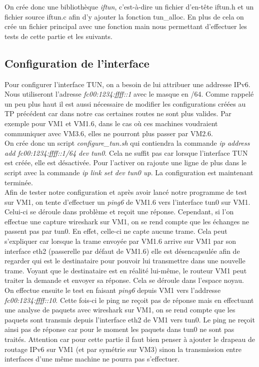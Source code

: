 \documentclass[a4paper, 12pt]{article}
\begin{document}
    On crée donc une bibliothèque \textit{iftun}, c'est-à-dire un fichier
    d'en-tête iftun.h et un fichier source iftun.c afin d'y ajouter la fonction
    tun\_alloc. En plus de cela on crée un fichier principal avec une fonction 
    main nous permettant d'effectuer les tests de cette partie et les suivants.

    \subsection{Configuration de l'interface}
    Pour configurer l'interface TUN, on a besoin de lui attribuer une addresse
    IPv6. Nous utiliseront l'adresse \textit{fc00:1234:ffff::1} avec le masque
    en /64. Comme rappelé un peu plus haut il est aussi nécessaire de modifier
    les configurations créées au TP précédent car dans notre cas certaines 
    routes ne sont plus valides. Par exemple pour VM1 et VM1.6, dans le cas où
    ces machines voudraient communiquer avec VM3.6, elles ne pourront plus 
    passer par VM2.6. \\

    On crée donc un script \textit{configure\_tun.sh} qui contiendra la commande
    \textit{ip address add fc00:1234:ffff::1/64 dev tun0}. Cela ne suffit pas 
    car lorsque l'interface TUN est créée, elle est désactivée. Pour l'activer 
    on rajoute une ligne de plus dans le script avec la commande \textit{ip 
    link set dev tun0 up}. La configuration est maintenant terminée. \\

    Afin de tester notre configuration et après avoir lancé notre programme de 
    test sur VM1, on tente d'effectuer un \textit{ping6} de VM1.6 vers 
    l'interface tun0 sur VM1. Celui-ci se déroule dans problème et reçoit une 
    réponse. Cependant, si l'on effectue une capture wireshark sur VM1, on se 
    rend compte que les échanges ne passent pas par tun0. En effet, celle-ci ne
    capte aucune trame. Cela peut s'expliquer car lorsque la trame envoyée par 
    VM1.6 arrive sur VM1 par son interface eth2 (passerelle par défaut de 
    VM1.6) elle est désencapsulée afin de regarder qui est le destinataire pour
    pouvoir lui transmettre dans une nouvelle trame. Voyant que le destinataire
    est en réalité lui-même, le routeur VM1 peut traiter la demande et envoyer 
    sa réponse. Cela se déroule dans l'espace noyau. \\

    On effectue ensuite le test en faisant \textit{ping6} depuis VM1 vers
    l'addresse \textit{fc00:1234:ffff::10}. Cette fois-ci le ping ne reçoit 
    pas de réponse mais en effectuant une analyse de paquets avec wireshark
    sur VM1, on se rend compte que les paquets sont transmis depuis 
    l'interface eth2 de VM1 vers tun0. Le ping ne reçoit ainsi pas de réponse 
    car pour le moment les paquets dans tun0 ne sont pas traités. Attention 
    car pour cette partie il faut bien penser à ajouter le drapeau de routage
    IPv6 sur VM1 (et par symétrie sur VM3) sinon la transmission entre 
    interfaces d'une même machine ne pourra pas s'effectuer. 
\end{document}
